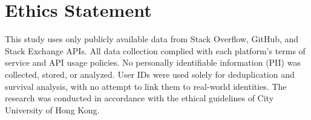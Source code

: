 \documentclass[11pt,a4paper]{article}
\begin{document}
\section{Ethics Statement}
\label{app:ethics}

This study uses only publicly available data from Stack Overflow, GitHub, and Stack Exchange APIs. All data collection complied with each platform's terms of service and API usage policies. No personally identifiable information (PII) was collected, stored, or analyzed. User IDs were used solely for deduplication and survival analysis, with no attempt to link them to real-world identities. The research was conducted in accordance with the ethical guidelines of City University of Hong Kong.
\end{document}
